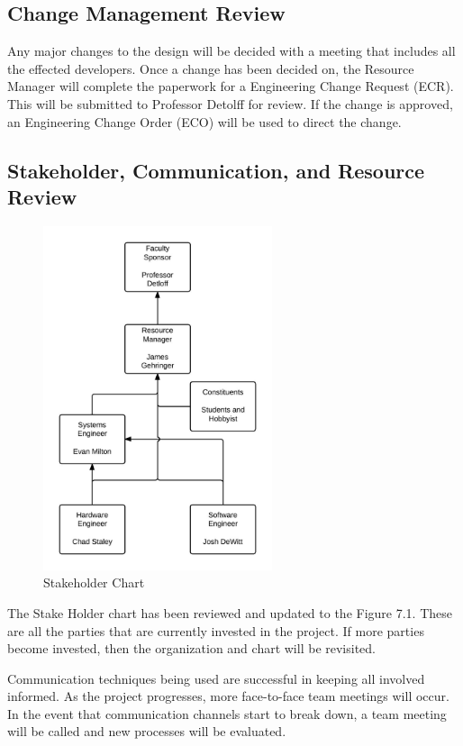 \subsection{Change Management Review}
Any major changes to the design will be decided with a meeting that includes all the effected developers.
Once a change has been decided on, the Resource Manager will complete the paperwork for a Engineering Change Request (ECR).
This will be submitted to Professor Detolff for review.
If the change is approved, an Engineering Change Order (ECO) will be used to direct the change.

\subsection{Stakeholder, Communication, and Resource Review}
\begin{figure}[H]
\centering
\includegraphics[width=0.6\textwidth]{shc.jpeg}
\caption{Stakeholder Chart}
\label{fig:Stakeholder Chart}
\end{figure}
The Stake Holder chart has been reviewed and updated to the Figure 7.1.
These are all the parties that are currently invested in the project. 
If more parties become invested, then the organization and chart will be revisited. 

Communication techniques being used are successful in keeping all involved informed.
As the project progresses, more face-to-face team meetings will occur.
In the event that communication channels start to break down, a team meeting will be called and new processes will be evaluated. 


